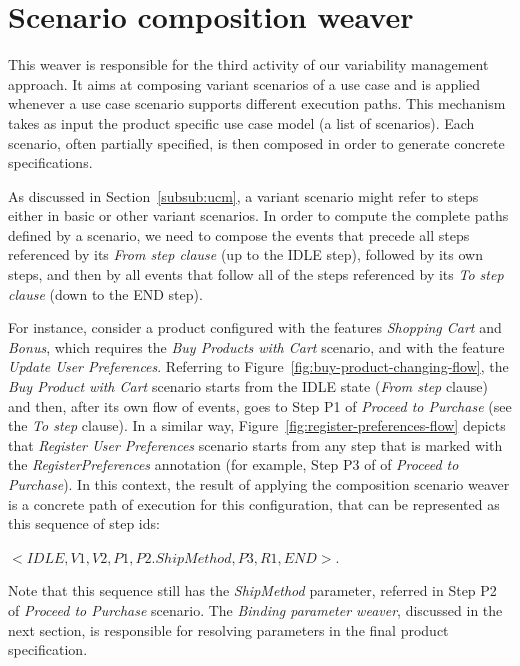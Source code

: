 \documentclass[11pt]{report}
\begin{document}

\section{Scenario composition weaver}\label{sub:sc-weaver}

This weaver is responsible for the third activity of our variability management 
approach. It aims at composing variant scenarios of a use case and is applied whenever a use case scenario supports different execution paths.
This mechanism takes as input the product specific use case model (a list of scenarios). Each scenario, often partially specified, is then composed in order to generate concrete specifications.

As discussed in Section~\ref{subsub:ucm}, a variant scenario 
might refer to steps either in basic or other variant scenarios. In order
to compute the complete paths defined by a scenario, we need to compose the events that precede all steps referenced by its \emph{From step
clause} (up to the IDLE step), followed by its own steps, and then by all
events that follow all of the steps referenced by its \emph{To step clause} (down to the END step). 

For instance, consider a product configured with the features \emph{Shopping Cart} and \emph{Bonus}, which requires the \emph{Buy Products with Cart} scenario, and with the feature \emph{Update User Preferences}. Referring to Figure~\ref{fig:buy-product-changing-flow}, the  \emph{Buy Product with Cart} scenario starts from the IDLE state (\emph{From step} clause) and then, after its own flow of events, goes to Step P1 of \emph{Proceed to Purchase} (see the \emph{To step} clause). In a similar way, Figure~\ref{fig:register-preferences-flow} depicts that \emph{Register User Preferences} scenario starts from any step that is marked with the \emph{RegisterPreferences} annotation (for example, Step P3 of of \emph{Proceed to Purchase}). In this context, the result of applying the composition scenario weaver is a concrete path of execution for this configuration, that can be represented as this sequence of step ids: 

\begin{center}
\begin{small}
\mbox{$<IDLE, V1, V2, P1, P2.ShipMethod, P3, R1, END>$}.
\end{small}
\end{center}

Note that this sequence still has  the \emph{ShipMethod} parameter, 
referred in Step P2 of \emph{Proceed to Purchase} scenario. The \emph{Binding parameter weaver}, discussed in the next section, is responsible for resolving parameters in the final 
product specification.  
\end{document}
